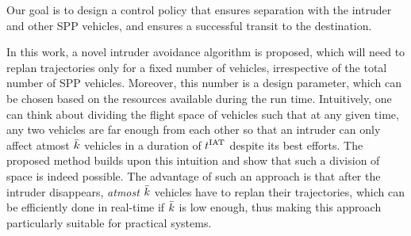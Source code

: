 Our goal is to design a control policy that ensures separation with the intruder and other SPP vehicles, and ensures a successful transit to the destination. %

In this work, a novel intruder avoidance algorithm is proposed, which will need to replan trajectories only for a fixed number of vehicles, irrespective of the total number of SPP vehicles. Moreover, this number is a design parameter, which can be chosen based on the resources available during the run time. Intuitively, one can think about dividing the flight space of vehicles such that at any given time, any two vehicles are far enough from each other so that an intruder can only affect atmost $\bar{k}$ vehicles in a duration of $t^\text{IAT}$ despite its best efforts. The proposed method builds upon this intuition and show that such a division of space is indeed possible. The advantage of such an approach is that after the intruder disappears, \textit{atmost $\bar{k}$} vehicles have to replan their trajectories, which can be efficiently done in real-time if $\bar{k}$ is low enough, thus making this approach particularly suitable for practical systems. %


